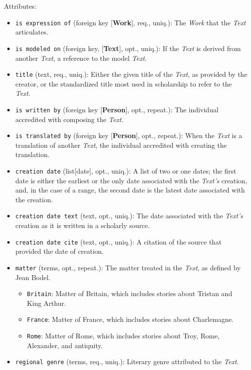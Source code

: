 \vspace{1em}
\noindent Attributes:
\begin{itemize}
    \item \texttt{is expression of} (foreign key [\textbf{Work}], req., uniq.): The \textit{Work} that the \textit{Text} articulates.
    \item \texttt{is modeled on} (foreign key, [\textbf{Text}], opt., uniq.): If the \textit{Text} is derived from another \textit{Text}, a reference to the model \textit{Text}.
    \item \texttt{title} (text, req., uniq.): Either the given title of the \textit{Text}, as provided by the creator, or the standardized title most used in scholarship to refer to the \textit{Text}.
    \item \texttt{is written by} (foreign key [\textbf{Person}], opt., repeat.): The individual accredited with composing the \textit{Text}.
    \item \texttt{is translated by} (foreign key [\textbf{Person}], opt., repeat.): When the \textit{Text} is a translation of another \textit{Text}, the individual accredited with creating the translation.
    \item \texttt{creation date} (list[date], opt., uniq.): A list of two or one dates; the first date is either the earliest or the only date associated with the \textit{Text's} creation, and, in the case of a range, the second date is the latest date associated with the creation.
    \item \texttt{creation date text} (text, opt., uniq.): The date associated with the \textit{Text's} creation as it is written in a scholarly source.
    \item \texttt{creation date cite} (text, opt., uniq.): A citation of the source that provided the date of creation.
    \item \texttt{matter} (terms, opt., repeat.): The matter treated in the \textit{Text}, as defined by Jean Bodel.
    \begin{itemize}
        \item \texttt{Britain}: Matter of Britain, which includes stories about Tristan and King Arthur.
        \item \texttt{France}: Matter of France, which includes stories about Charlemagne.
        \item \texttt{Rome}: Matter of Rome, which includes stories about Troy, Rome, Alexander, and antiquity.
    \end{itemize}
    \item \texttt{regional genre} (terms, req., uniq.): Literary genre attributed to the \textit{Text}.

\end{itemize}
